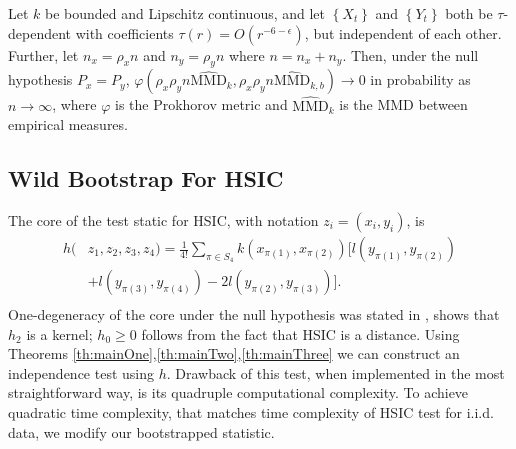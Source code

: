 \begin{proposition}\label{prop:mmd}
 Let $k$ be bounded and Lipschitz continuous, and let $\left\{ X_t \right\}$ and $\left\{ Y_t \right\}$ 
 both be $\tau$-dependent with coefficients $\tau(r) =  O(r^{-6-\epsilon})$, but independent of each other. Further, let $n_x=\rho_x n$ and $n_y=\rho_y n$ where $n=n_x+n_y$. Then, under the null hypothesis $P_x=P_y$, $\varphi\left(\rho_x \rho_y n\widehat{\text{MMD}}_k, \rho_x \rho_y n\widehat{\text{MMD}}_{k,b}\right)\to 0$ in probability as $n\to\infty$, where $\varphi$ is the Prokhorov metric and $\widehat{\text{MMD}}_k$ is the MMD between empirical measures.
\end{proposition}

\subsection{Wild Bootstrap For HSIC}\label{sec:hsic}

The core of the test static for HSIC, with notation $z_i = (x_i,y_i)$, is  
\begin{equation*}
\begin{split}
h(&z_1,z_2,z_3,z_4) = \frac{1}{4!} \sum_{\pi \in S_4}  k(x_{\pi(1)},x_{\pi(2)}) [  l(y_{\pi(1)},y_{\pi(2)})  \\
 &+  l(y_{\pi(3)},y_{\pi(4)}) - 2  l(y_{\pi(2)},y_{\pi(3)})] . \\
\end{split}  
\end{equation*}
One-degeneracy of the core under the null hypothesis was stated in \cite[Theorem 2]{gretton_kernel_2008}, \cite[Section A.2, following eq. (11)]{gretton_kernel_2008} shows that $h_2$ is a kernel; $h_0\geq 0$ follows from the fact that HSIC is a distance. Using Theorems \ref{th:mainOne},\ref{th:mainTwo},\ref{th:mainThree} we can construct an independence test using $h$. Drawback of this test, when implemented in the most straightforward way,  is its quadruple computational complexity. To achieve quadratic time complexity, that matches time complexity of HSIC test for i.i.d. data, we modify our bootstrapped statistic.

